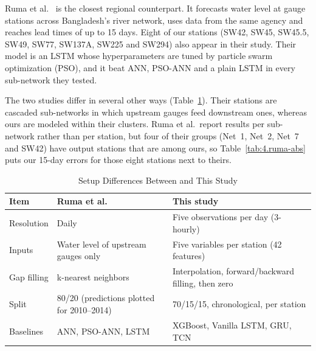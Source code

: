 Ruma et al.~\cite{Ruma2023} is the closest regional counterpart. It forecasts
water level at gauge stations across Bangladesh's river network, uses data from
the same agency and reaches lead times of up to 15 days. Eight of our stations
(SW42, SW45, SW45.5, SW49, SW77, SW137A, SW225 and SW294) also appear in their study.
Their model is an LSTM whose hyperparameters are tuned by particle swarm
optimization (PSO), and it beat ANN, PSO-ANN and a plain LSTM in every
sub-network they tested.


The two studies differ in several other ways (Table~\ref{tab:4.ruma-setup}).
Their stations are cascaded sub-networks in which upstream gauges feed downstream
ones, whereas ours are modeled within their clusters. Ruma et al.\ report results
per sub-network rather than per station, but four of their groups (Net~1, Net~2,
Net~7 and SW42) have output stations that are among ours, so
Table~\ref{tab:4.ruma-abs} puts our 15-day errors for those eight stations next to
theirs.

\begin{table}[htbp]
  \centering
  \caption{Setup Differences Between \cite{Ruma2023} and This Study}
  \label{tab:4.ruma-setup}
  \small
  \renewcommand{\arraystretch}{1.15}
  \begin{tabularx}{\textwidth}{@{}p{3.0cm} X X@{}}
    \toprule
    \textbf{Item} & \textbf{Ruma et al.} & \textbf{This study} \\
    \midrule
    Resolution & Daily & Five observations per day (3-hourly) \\
    Inputs & Water level of upstream gauges only & Five variables per station (42 features) \\
    Gap filling & k-nearest neighbors & Interpolation, forward/backward filling, then zero \\
    Split & 80/20 (predictions plotted for 2010--2014) & 70/15/15, chronological, per station \\
    Baselines & ANN, PSO-ANN, LSTM & XGBoost, Vanilla LSTM, GRU, TCN \\
    \bottomrule
  \end{tabularx}
\end{table}

